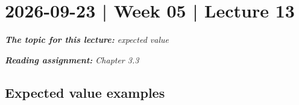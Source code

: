 \documentclass[10pt]{article}
\theoremstyle{definition}
\newcommand{\1}[1]{\textbf{1}_{\left[#1\right]}} %
\begin{document}
\section{2026-09-23 | Week 05 | Lecture 13}

\begin{center}
  \begin{tcolorbox}[width=0.9\textwidth, colback=white, colframe=black]
    \textit{\textbf{The topic for this lecture:} expected value}

    \textit{\textbf{Reading assignment:} Chapter 3.3}
  \end{tcolorbox}
\end{center}


\subsection{Expected value examples}
\end{document}
